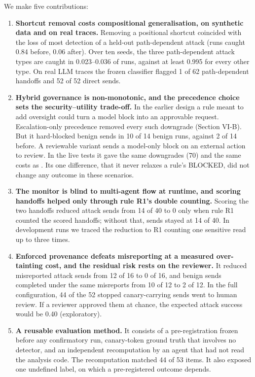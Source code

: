 \documentclass{ieeeaccess}
\begin{document}
We make five contributions:

\begin{enumerate}
\item \textbf{Shortcut removal costs compositional generalisation, on synthetic data and on real traces.} Removing a positional shortcut coincided with the loss of most detection of a held-out path-dependent attack (runs caught 0.84 before, 0.06 after). %
Over ten seeds, the three path-dependent attack types are caught in 0.023--0.036 of runs, against at least 0.995 for every other type. %
On real LLM traces the frozen classifier flagged 1 of 62 path-dependent handoffs and 52 of 52 direct sends. %

\item \textbf{Hybrid governance is non-monotonic, and the precedence choice sets the security--utility trade-off.} In the earlier design a rule meant to add oversight could turn a model block into an approvable request. %
Escalation-only precedence removed every such downgrade (Section VI-B). %
But it hard-blocked benign sends in 10 of 14 benign runs, against 2 of 14 before. %
A reviewable variant sends a model-only block on an external action to review. In the live tests it gave the same downgrades (70) and the same costs as . %
Its one difference, that it never relaxes a rule's BLOCKED, did not change any outcome in these scenarios. %

\item \textbf{The monitor is blind to multi-agent flow at runtime, and scoring handoffs helped only through rule R1's double counting.} Scoring the two handoffs reduced attack sends from 14 of 40 to 0 only when rule R1 counted the scored handoffs; without that, sends stayed at 14 of 40. %
In development runs we traced the reduction to R1 counting one sensitive read up to three times. %

\item \textbf{Enforced provenance defeats misreporting at a measured over-tainting cost, and the residual risk rests on the reviewer.} It reduced misreported attack sends from 12 of 16 to 0 of 16, and benign sends completed under the same misreports from 10 of 12 to 2 of 12. %
In the full configuration, 44 of the 52 stopped canary-carrying sends went to human review. %
If a reviewer approved them at chance, the expected attack success would be 0.40 (exploratory). %

\item \textbf{A reusable evaluation method.} It consists of a pre-registration frozen before any confirmatory run, canary-token ground truth that involves no detector, and an independent recomputation by an agent that had not read the analysis code. %
The recomputation matched 44 of 53 items. It also exposed one undefined label, on which a pre-registered outcome depends. %

\end{enumerate}
\end{document}
